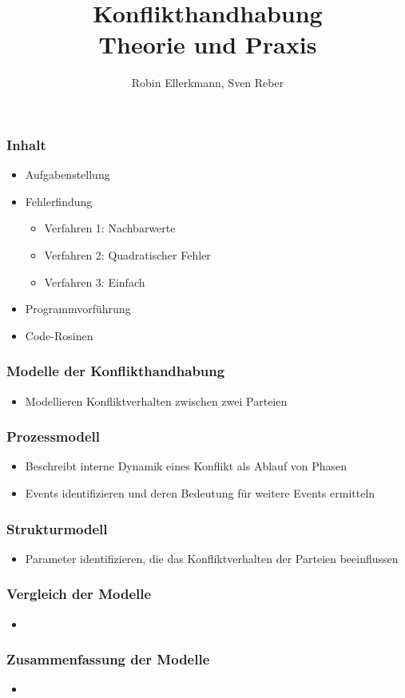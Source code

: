\documentclass[12pt,a4paper]{beamer}
\author{Robin Ellerkmann, Sven Reber}
\title{Konflikthandhabung\\Theorie und Praxis}
\begin{document}
\maketitle

\begin{frame}
	\frametitle{Inhalt}
	
	\begin{itemize}
		\item Aufgabenstellung
		\item Fehlerfindung
		\begin{itemize}
			\item Verfahren 1: Nachbarwerte
			\item Verfahren 2: Quadratischer Fehler
			\item Verfahren 3: Einfach
		\end{itemize}
		\item Programmvorf\"uhrung
		\item Code-Rosinen
	\end{itemize}
\end{frame}

\begin{frame}
	\frametitle{Modelle der Konflikthandhabung}
	\begin{itemize}
		\item Modellieren Konfliktverhalten zwischen zwei Parteien
	\end{itemize}
\end{frame}

\begin{frame}
	\frametitle{Prozessmodell}
	\begin{itemize}
		\item Beschreibt interne Dynamik eines Konflikt als Ablauf von Phasen
		\item Events identifizieren und deren Bedeutung für weitere Events ermitteln
	\end{itemize}
\end{frame}


\begin{frame}
	\frametitle{Strukturmodell}
	\begin{itemize}
		\item Parameter identifizieren, die das Konfliktverhalten der Parteien beeinflussen 
	\end{itemize}
\end{frame}


\begin{frame}
	\frametitle{Vergleich der Modelle}
	\begin{itemize}
		\item 
	\end{itemize}
\end{frame}

\begin{frame}
	\frametitle{Zusammenfassung der Modelle}
	\begin{itemize}
		\item 
	\end{itemize}
\end{frame}
\end{document}
